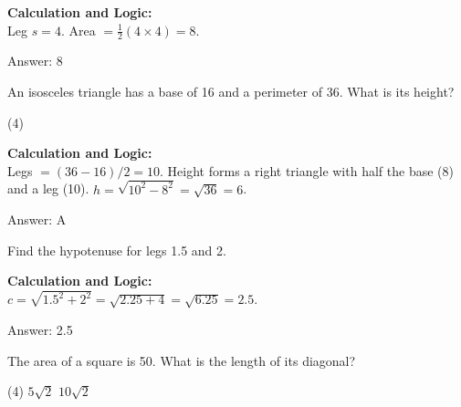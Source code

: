 \documentclass[11pt,paper=a4,answers]{exam}
\begin{document}
\begin{questions}
\begin{solution}
\textbf{Calculation and Logic:} \\
Leg $s = 4$. Area $= \frac{1}{2}(4 \times 4) = 8$.

\vspace{30pt}

Answer: \colorbox{yellow!100}{8}
\end{solution}

\vspace{60pt}

\question
An isosceles triangle has a base of 16 and a perimeter of 36. What is its height?
\begin{tasks}(4)
\end{tasks}

\begin{solution}
\textbf{Calculation and Logic:} \\
Legs $= (36 - 16) / 2 = 10$. Height forms a right triangle with half the base (8) and a leg (10). $h = \sqrt{10^2 - 8^2} = \sqrt{36} = 6$.

\vspace{30pt}

Answer: \colorbox{yellow!100}{A}
\end{solution}

\vspace{60pt}

\question
Find the hypotenuse for legs 1.5 and 2.

\begin{solution}
\textbf{Calculation and Logic:} \\
$c = \sqrt{1.5^2 + 2^2} = \sqrt{2.25 + 4} = \sqrt{6.25} = 2.5$.

\vspace{30pt}

Answer: \colorbox{yellow!100}{2.5}
\end{solution}

\vspace{60pt}

\question
The area of a square is 50. What is the length of its diagonal?
\begin{tasks}(4)
    \task $5\sqrt{2}$
    \task $10\sqrt{2}$
\end{tasks}


\end{questions}
\end{document}
